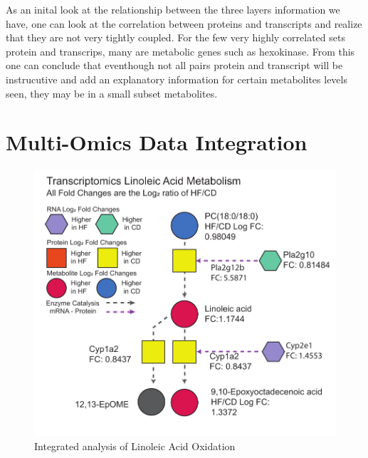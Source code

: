 \documentclass[a4paper,11pt,twoside]{book}
\begin{document}
	
	As an inital look at the relationship between the three layers information we have, one can look at the correlation between proteins and transcripts and realize that they are not very tightly coupled. For the few very highly correlated sets protein and transcrips, many are metabolic genes such as hexokinase. From this one can conclude that eventhough not all pairs protein and transcript will be instrucutive and add an explanatory information for certain metabolites levels seen, they may be in a small subset metabolites. 
	
	\section{ Multi-Omics Data Integration }

\begin{figure}[hb!]
		\centering
		\includegraphics[width=\linewidth]{3.Trancriptomics/Integrated_Linoic_Acid}
		\caption{Integrated analysis of Linoleic Acid Oxidation}
		\label{fig: Integrated Model of Linoleic Acid Oxidation}
\end{figure}
\end{document}
